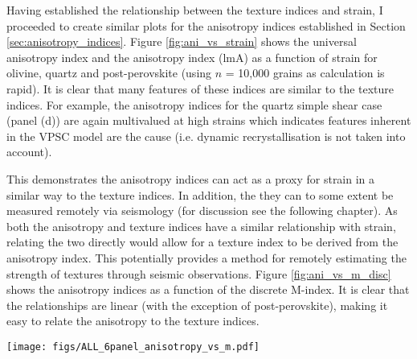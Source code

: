 \documentclass[a4paper,12pt,twoside]{report}
\numberwithin{equation}{chapter}
\begin{document}
Having established the relationship between the texture indices and strain, I proceeded to create similar plots for the anisotropy indices established in Section \ref{sec:anisotropy_indices}. Figure \ref{fig:ani_vs_strain} shows the universal anisotropy index \citep[uA,][]{Ranganathan2008} and the \cite{Ledbetter2006} anisotropy index (lmA) as a function of strain for olivine, quartz and post-perovskite (using $n$ = 10,000 grains as calculation is rapid). It is clear that many features of these indices are similar to the texture indices. For example, the anisotropy indices for the quartz simple shear case (panel (d)) are again multivalued at high strains which indicates features inherent in the VPSC model are the cause (i.e. dynamic recrystallisation is not taken into account).    

This demonstrates the anisotropy indices can act as a proxy for strain in a similar way to the texture indices. In addition, the they can to some extent be measured remotely via seismology (for discussion see the following chapter). As both the anisotropy and texture indices have a similar relationship with strain, relating the two directly would allow for a texture index to be derived from the anisotropy index. This potentially provides a method for remotely estimating the strength of textures through seismic observations. Figure \ref{fig:ani_vs_m_disc} shows the anisotropy indices as a function of the discrete M-index. It is clear that the relationships are linear (with the exception of post-perovskite), making it easy to relate the anisotropy to the texture indices. 

\begin{figure*}[p]
  \centering
    \texttt{[image: figs/ALL\_6panel\_anisotropy\_vs\_m.pdf]}
  \caption[Relationship of anisotropy indices and M-index (disc)]{Seismic anisotropy measures, the Universal Elastic Anisotropy Index (uA) and the \cite{Ledbetter2006} index (lmA) as a function of the discrete M-index. \textbf{Top row} shows data from olivine VPSC models, \textbf{middle row} shows quartz, and \textbf{bottom row} shows post-perovskite. \textbf{Right column} shows data from axial compression models and \textbf{left column} shows data from simple shear models. All calculations use $n$ = 10,000 grains.} 
  \label{fig:ani_vs_m_disc}
\end{figure*} 
 
\end{document}
